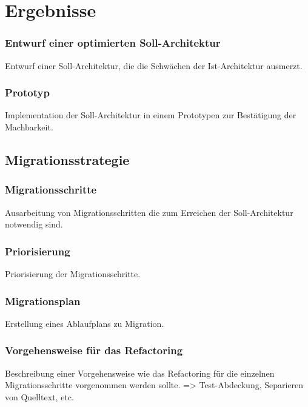 \chapter{Ergebnisse}




% 
\subsection{Entwurf einer optimierten Soll-Architektur}
Entwurf einer Soll-Architektur, die die Schwächen der Ist-Architektur ausmerzt.

\subsection{Prototyp}
Implementation der Soll-Architektur in einem Prototypen zur Bestätigung der Machbarkeit.

\section{Migrationsstrategie}
\subsection{Migrationsschritte}
Ausarbeitung von Migrationsschritten die zum Erreichen der Soll-Architektur notwendig sind.

\subsection{Priorisierung}
Priorisierung der Migrationsschritte.

\subsection{Migrationsplan}
Erstellung eines Ablaufplans zu Migration.

\subsection{Vorgehensweise für das Refactoring}
Beschreibung einer Vorgehensweise wie das Refactoring für die einzelnen Migrationsschritte vorgenommen werden sollte.
=> Test-Abdeckung, Separieren von Quelltext, etc.
